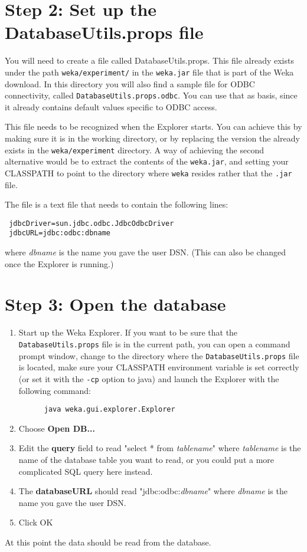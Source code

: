 \section*{Step 2: Set up the DatabaseUtils.props file}
You will need to create a file called DatabaseUtils.props. This file already exists under the path \texttt{weka/experiment/} in the \texttt{weka.jar} file that is part of the Weka download. In this directory you will also find a sample file for ODBC connectivity, called \texttt{DatabaseUtils.props.odbc}. You can use that as basis, since it already contains default values specific to ODBC access.

This file needs to be recognized when the Explorer starts. You can achieve this by making sure it is in the working directory, or by replacing the version the already exists in the \texttt{weka/experiment} directory. A way of achieving the second alternative would be to extract the contents of the \texttt{weka.jar}, and setting your CLASSPATH to point to the directory where \texttt{weka} resides rather that the \texttt{.jar} file.

The file is a text file that needs to contain the following lines:

\begin{verbatim}
 jdbcDriver=sun.jdbc.odbc.JdbcOdbcDriver
 jdbcURL=jdbc:odbc:dbname
\end{verbatim}

\noindent where \textit{dbname} is the name you gave the user DSN. (This can also be changed once the Explorer is running.)

\newpage
\section*{Step 3: Open the database}
\begin{enumerate}
	\item Start up the Weka Explorer. If you want to be sure that the \texttt{DatabaseUtils.props} file is in the current path, you can open a command prompt window, change to the directory where the \texttt{DatabaseUtils.props} file is located, make sure your CLASSPATH environment variable is set correctly (or set it with the \texttt{-cp} option to java) and launch the Explorer with the following command:
	\begin{verbatim}
	  java weka.gui.explorer.Explorer 
	\end{verbatim}
	\item Choose \textbf{Open DB...}
	\item Edit the \textbf{query} field to read "select * from \textit{tablename}" where \textit{tablename} is the name of the database table you want to read, or you could put a more complicated SQL query here instead.
	\item The \textbf{databaseURL} should read "jdbc:odbc:\textit{dbname}" where \textit{dbname} is the name you gave the user DSN.
	\item Click OK
\end{enumerate}

\noindent At this point the data should be read from the database.
